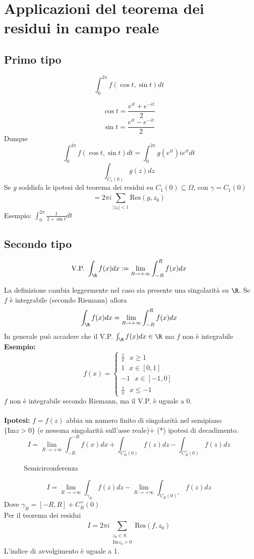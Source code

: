 
\section{Applicazioni del teorema dei residui in campo reale}
\subsection{Primo tipo}
\begin{tcolorbox}
\[\int_{0}^{2\pi} f(\cos t, \sin t)dt\]
\end{tcolorbox}
\[\cos t = \frac{e^{it}+e^{-it}}{2}\]
\[\sin t = \frac{e^{it}-e^{-it}}{2}\]
Dunque 
\[\int_{0}^{2\pi} f(\cos t, \sin t)dt=\int_{0}^{2\pi} g(e^{it})ie^{it}dt \]
\[\int_{C_1(0)}^{} g(z)dz\]
Se $g$ soddisfa le ipotesi del teorema dei residui su $C_1(0) \subseteq  \Omega$, con $\gamma=C_1(0)$
\[=2\pi i \sum_{|z_0|<1}^{} \text{Res}(g,z_0)\]
Esempio: $\int_{0}^{2\pi} \frac{1}{2+\sin t}dt$
\subsection{Secondo tipo}
\begin{tcolorbox}	
	\[\text{V.P.  }\int_{\R}^{} f(x)dx:= \lim_{R \to +\infty} \int_{-R}^{R} f(x)dx \] 
\end{tcolorbox}
La definizione cambia leggermente nel caso sia presente una singolarità su $\R$.
Se $f$ è integrabile (secondo Riemann) allora 
\[\int_{\R}^{} f(x)dx=\lim_{R \to +\infty} \int_{-R}^{R} f(x)dx\]
In generale può accadere che il V.P. $\int_{\R}^{} f(x)dx \in\R$ ma $f$ non è integrabile
\textbf{Esempio:} 
\[f(x)=\begin{cases}
	\frac{1}{x}\ \ \ x\ge 1\\
	1\ \ \ x\in[0,1]\\
	-1\ \ \ x\in[-1,0]\\
	\frac{1}{x}\ \ \ x\le -1
\end{cases}
\]
$f$ non è integrabile secondo Riemann, ma il V.P. è uguale a 0.\\\divider
\\\textbf{Ipotesi: }$f=f(z)$ abbia un numero finito di singolarità nel semipiano $\{\text{Im}z>0\} $ (e nessuna singolarità sull'asse reale)+ (*) ipotesi di decadimento.
\[I=\lim_{R \to +\infty} \int_{-R}^{-R} f(x)dx+\int_{C_R^+(0)}^{} f(z)dz-\int_{C_R^+(0)}^{} f(z)dz \]
\begin{figure}[ht]
    \centering
    \caption{Semicirconferenza}
    \label{fig:semicirconferenza}
\end{figure}
\[I=\lim_{R \to +\infty} \int_{\gamma_R}{f(z)dz} -\lim_{R \to +\infty} \int_{C_R(0)^+}^{} f(z)dz\]
Dove $\gamma_R=[-R,R]+C_R^+(0)$
\\Per il teorema dei residui
\[I=2\pi i \sum_{\substack{z_0\in S,\\  \text{Im}z_0>0}}^{} \text{Res}(f,z_0)\]
L'indice di avvolgimento è uguale a 1.
